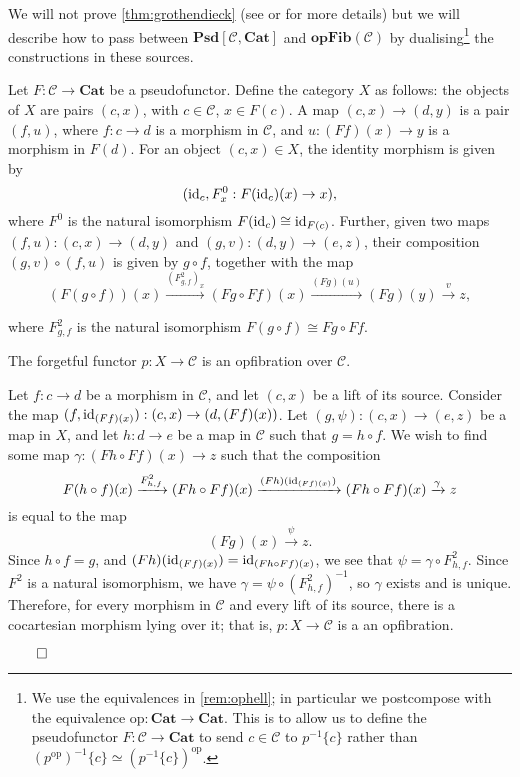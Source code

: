 \documentclass{MetricNotes2023}
\def\id{\ensuremath\text{id}}
\def\done{\begin{flushright}\vspace{-4.35ex}\(\qed\)\end{flushright}}
\begin{document}
We will not prove \ref{thm:grothendieck} (see \autocite{monoidalgrothendieck} or \autocite{2dimensional} for more details) but we will describe how to pass between \(\textbf{Psd}[\mathcal{C}, \textbf{Cat}]\) and \(\textbf{opFib}(\mathcal{C})\) by dualising\footnote{We use the equivalences in \ref{rem:ophell}; in particular we postcompose with the equivalence \(\text{op} : \textbf{Cat}\to \textbf{Cat}\). This is to allow us to define the pseudofunctor \(F : \mathcal{C} \to \textbf{Cat}\) to send \(c\in \mathcal{C}\) to \(p^{-1}\{c\}\) rather than \((p^{\text{op}})^{-1}\{c\}\simeq (p^{-1}\{c\})^{\text{op}}\).} the constructions in these sources.

Let \(F : \mathcal{C} \to \textbf{Cat}\) be a pseudofunctor. Define the category \(X\) as follows: the objects of \(X\) are pairs \((c, x)\), with \(c \in \mathcal{C}\), \(x \in F(c)\). A map \((c, x)\to (d, y)\) is a pair \((f, u)\), where \(f : c \to d\) is a morphism in \(\mathcal{C}\), and \(u : (Ff)(x)\to y\) is a morphism in \(F(d)\). For an object \((c, x) \in X\), the identity morphism is given by
\[(\id_c, F^0_x : F(\id_c)(x)\to x),\]
where \(F^0\) is the natural isomorphism \( F(\id_c)\cong \id_{F(c)} \). Further, given two maps \((f, u) : (c, x) \to (d, y)\) and \((g, v) : (d, y)\to (e, z)\), their composition \((g,v)\circ (f, u)\) is given by \(g \circ f\), together with the map
\[(F(g\circ f))(x) \xrightarrow{\left(F^2_{g,f}\right)_x} (Fg \circ Ff)(x) \xrightarrow{(Fg)(u)} (Fg)(y)\xrightarrow{v} z,\]

where \(F^2_{g, f}\) is the natural isomorphism \( F(g \circ f)\cong Fg \circ Ff\). 

\begin{lemma}
The forgetful functor \(p : X \to \mathcal{C}\) is an opfibration over \(\mathcal{C}\).
\end{lemma}

\begin{ourproof}
Let \(f : c \to d\) be a morphism in \(\mathcal{C}\), and let \((c,x)\) be a lift of its source. Consider the map \((f, \id_{(Ff)(x)}) : (c, x)\to (d, (Ff)(x))\). Let \((g, \psi) : (c, x)\to (e, z)\) be a map in \(X\), and let \(h : d \to e\) be a map in \(\mathcal{C}\) such that \(g = h \circ f\). We wish to find some map \(\gamma : (Fh \circ Ff)(x) \to z\) such that the composition
\[F(h \circ f)(x)\xrightarrow{F^2_{h,f}}(Fh\circ Ff)(x)\xrightarrow{(Fh)(\id_{(Ff)(x)})}(Fh\circ Ff)(x)\xrightarrow\gamma z\]
is equal to the map
\[(Fg)(x)\xrightarrow{\psi} z.\]
Since \(h \circ f=g\), and \((Fh)(\id_{(Ff)(x)})=\id_{(Fh\circ Ff)(x)}\), we see that \(\psi = \gamma \circ F^2_{h,f}\). Since \(F^2\) is a natural isomorphism, we have \(\gamma = \psi \circ (F^2_{h,f})^{-1}\), so \(\gamma\) exists and is unique. Therefore, for every morphism in \(\mathcal{C}\) and every lift of its source, there is a cocartesian morphism lying over it; that is, \(p : X \to \mathcal{C}\) is a an opfibration. \done
\end{ourproof} 
\end{document}
